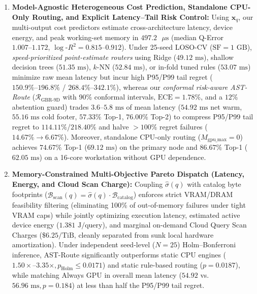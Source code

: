 \documentclass[10pt,a4paper]{article}
\begin{document}
\begin{enumerate}
    \item \textbf{Model-Agnostic Heterogeneous Cost Prediction, Standalone CPU-Only Routing, and Explicit Latency--Tail Risk Control:} Using $\mathbf{x}_q$, our multi-output cost predictors estimate cross-architecture latency, device energy, and peak working-set memory in $497.2\text{ }\mu\text{s}$ (median Q-Error $1.007\text{--}1.172$, $\log\text{-}R^2=0.815\text{--}0.912$). Under 25-seed LOSO-CV ($\text{SF}=1\text{ GB}$), \emph{speed-prioritized point-estimate routers} using Ridge ($49.12\text{ ms}$), shallow decision trees ($51.35\text{ ms}$), $k$-NN ($52.84\text{ ms}$), or in-fold tuned rules ($53.07\text{ ms}$) minimize raw mean latency but incur high P95/P99 tail regret ($150.9\%\text{--}196.8\%$ / $268.4\%\text{--}342.1\%$), whereas our \emph{conformal risk-aware AST-Route} ($\mathcal{R}_{\text{GBR-9D}}$ with 90\% conformal intervals, $\text{ECE}=1.78\%$, and a $12\%$ abstention guard) trades $3.6\text{--}5.8\text{ ms}$ of mean latency ($54.92\text{ ms}$ net warm, $55.16\text{ ms}$ cold footer, $57.33\%$ Top-1, $76.00\%$ Top-2) to compress P95/P99 tail regret to $114.11\%$/$218.40\%$ and halve $>100\%$ regret failures ($14.67\%\rightarrow 6.67\%$). Moreover, standalone CPU-only routing ($M_{\text{gpu\_max}}=0$) achieves $74.67\%$ Top-1 ($69.12\text{ ms}$) on the primary node and $86.67\%$ Top-1 ($62.05\text{ ms}$) on a 16-core workstation without GPU dependence.

    \item \textbf{Memory-Constrained Multi-Objective Pareto Dispatch (Latency, Energy, and Cloud Scan Charge):} Coupling $\hat{\sigma}(q)$ with catalog byte footprints ($\hat{\mathcal{B}}_{\text{scan}}(q)=\hat{\sigma}(q)\cdot\mathcal{B}_{\text{catalog}}$) enforces strict VRAM/DRAM feasibility filtering (eliminating 100\% of out-of-memory failures under tight VRAM caps) while jointly optimizing execution latency, estimated active device energy ($1.381\text{ J/query}$), and marginal on-demand Cloud Query Scan Charges ($\text{\$6.25/TiB}$, cleanly separated from sunk local hardware amortization). Under independent seed-level ($N=25$) Holm--Bonferroni inference, AST-Route significantly outperforms static CPU engines ($1.50\times\text{--}3.35\times, p_{\text{Holm}}\le 0.0171$) and static rule-based routing ($p=0.0187$), while matching Always GPU in overall mean latency ($54.92$ vs.\ $56.96\text{ ms}, p=0.184$) at less than half the P95/P99 tail regret.


\end{enumerate}
\end{document}
